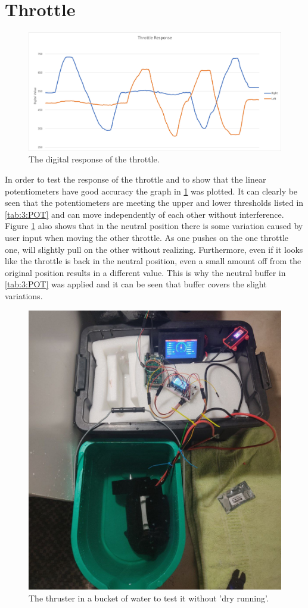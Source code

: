 \section{Throttle}
\begin{figure}
	\begin{center}
		\includegraphics[width = 0.8\linewidth]{figures/graphThrottle.jpg}
		\caption{The digital response of the throttle.}
		\label{fig:4:Throttleresponse}
	\end{center}
\end{figure}
In order to test the response of the throttle and to show that the linear potentiometers have good accuracy the graph in \ref{fig:4:Throttleresponse} was plotted. It can clearly be seen that the potentiometers are meeting the upper and lower thresholds listed in \ref{tab:3:POT} and can move independently of each other without interference. Figure \ref{fig:4:Throttleresponse} also shows that in the neutral position there is some variation caused by user input when moving the other throttle. As one pushes on the one throttle one, will slightly pull on the other without realizing. Furthermore, even if it looks like the throttle is back in the neutral position, even a small amount off from the original position results in a different value. This is why the neutral buffer in \ref{tab:3:POT} was applied and it can be seen that buffer covers the slight variations. 
\begin{figure}
	\begin{center}
		\includegraphics[width = 0.45\linewidth]{figures/thrusterBucket.jpg}
		\caption{The thruster in a bucket of water to test it without 'dry running'.}
		\label{fig:4:ThrusterTest}
	\end{center}
\end{figure}
